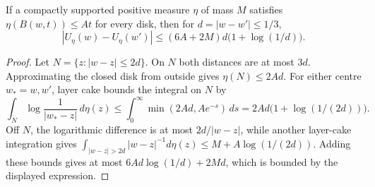 \begin{lemma}
\label{lem:v-potential-modulus}
If a compactly supported positive measure $\eta$ of mass $M$ satisfies
$\eta(B(w,t))\le At$ for every disk, then for $d=|w-w'|\le1/3$,
\[
 |U_\eta(w)-U_\eta(w')|
 \le(6A+2M)d\bigl(1+\log(1/d)\bigr).
\]
\end{lemma}
\begin{proof}
Let $N=\{z:|w-z|\le2d\}$.  On $N$ both distances are at most $3d$.
Approximating the closed disk from outside gives $\eta(N)\le2Ad$.  For
either centre $w_*=w,w'$, layer cake bounds
the integral on $N$ by
\[
 \int_N\log\frac1{|w_*-z|}\,d\eta(z)
 \le\int_0^\infty\min(2Ad,Ae^{-s})\,ds
 =2Ad\bigl(1+\log(1/(2d))\bigr).
\]
Off $N$, the logarithmic difference is at most $2d/|w-z|$, while another
layer-cake integration gives
$\int_{|w-z|>2d}|w-z|^{-1}d\eta(z)\le M+A\log(1/(2d))$.
Adding these bounds gives at most
$6Ad\log(1/d)+2Md$, which is bounded by the displayed expression.
\end{proof}


